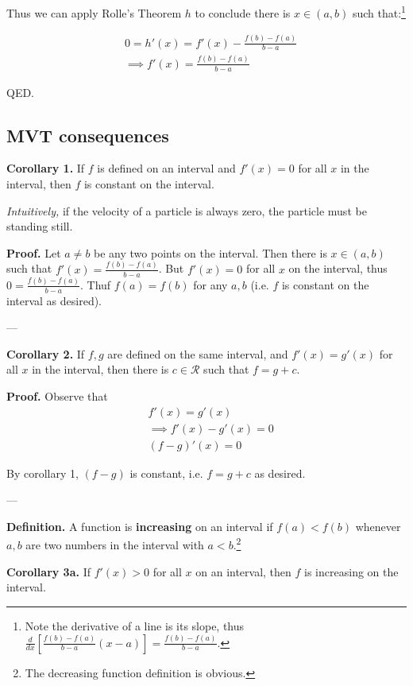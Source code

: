 Thus we can apply Rolle's Theorem $h$ to conclude there is $x\in(a,b)$
such that:\footnote{Note the derivative of a line is its slope, thus
  $\frac{d}{dx}\left[\frac{f(b)-f(a)}{b-a}(x-a)\right]=\frac{f(b)-f(a)}{b-a}$.}

\begin{align*}
  &0=h'(x)=f'(x)-\frac{f(b)-f(a)}{b-a}\\
  &\implies f'(x)=\frac{f(b)-f(a)}{b-a}
\end{align*}

QED.


\subsection{MVT consequences}
\textbf{Corollary 1.} If $f$ is defined on an interval and $f'(x)=0$
for all $x$ in the interval, then $f$ is constant on the interval.

\vs

\textit{Intuitively,} if the velocity of a particle is always zero,
the particle must be standing still.

\vs

\textbf{Proof.} Let $a\neq b$ be any two points on the interval. Then
there is $x\in(a,b)$ such that $f'(x)=\frac{f(b)-f(a)}{b-a}$. But
$f'(x)=0$ for all $x$ on the interval, thus $0=\frac{f(b)-f(a)}{b-a}$.
Thuf $f(a)=f(b)$ for any $a,b$ (i.e. $f$ is constant on the interval
as desired).

\vs---\vs

\textbf{Corollary 2.} If $f,g$ are defined on the same interval, and
$f'(x)=g'(x)$ for all $x$ in the interval, then there is
$c\in\mathcal{R}$ such that $f=g+c$.

\vs

\textbf{Proof.} Observe that
\begin{align*}
  &f'(x)=g'(x)\\
  &\implies f'(x)-g'(x)=0\\
  &(f-g)'(x)=0
\end{align*}

By corollary 1, $(f-g)$ is constant, i.e. $f=g+c$ as desired.

\vs---\vs

\textbf{Definition.} A function is \textbf{increasing} on an interval
if $f(a)<f(b)$ whenever $a,b$ are two numbers in the interval with
$a<b$.\footnote{The decreasing function definition is obvious.}

\vs

\textbf{Corollary 3a.} If $f'(x)>0$ for all $x$ on an interval, then
$f$ is increasing on the interval.

